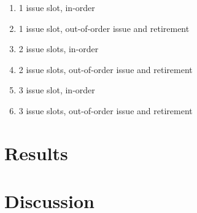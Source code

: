 \documentclass{article}
\begin{document}
\begin{enumerate}
    \item 1 issue slot, in-order 
    \item 1 issue slot, out-of-order issue and retirement 
    \item 2 issue slots, in-order 
    \item 2 issue slots, out-of-order issue and retirement 
    \item 3 issue slot, in-order 
    \item 3 issue slots, out-of-order issue and retirement 
\end{enumerate}

\section{Results}

\section{Discussion}
\end{document}
